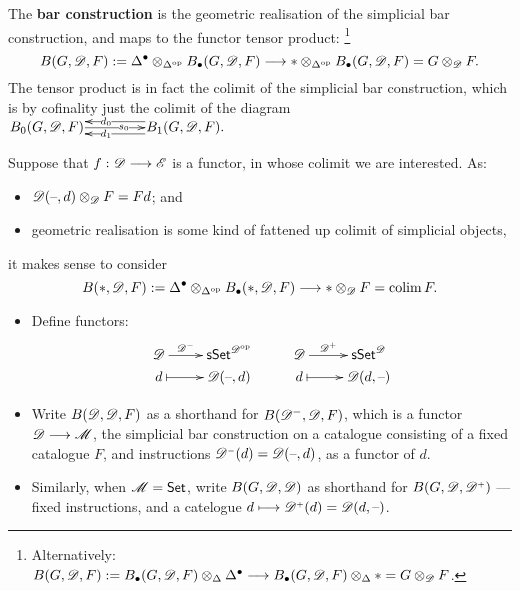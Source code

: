 \documentclass[11pt]{article}
\newcommand{\Dminus}{\scrD^\textup{\tiny$-$}}
\newcommand{\Dplus}{\scrD^\textup{\tiny$+$}}
\begin{document}
\begin{5. The unreasonably effective (co)bar construction}
\begin{itemise}
\item The \textbf{bar construction} is the geometric realisation of the simplicial bar construction, and maps to the functor tensor product:%
\footnote{Alternatively: $B(G,\mathscr{D},F):=B_\bullet (G,\mathscr{D},F)\otimes _{\Delta}\Delta^\bullet\longrightarrow B_\bullet (G,\mathscr{D},F)\otimes _{\Delta}*=G\otimes _{\mathscr{D}} F$.}
\[B(G,\mathscr{D},F):=\Delta^\bullet\otimes _{\Delta^{\textup{op}}}B_\bullet (G,\mathscr{D},F)\longrightarrow *\otimes _{\Delta^{\textup{op}}}B_\bullet (G,\mathscr{D},F)=G\otimes _{\mathscr{D}} F.\]
The tensor product is in fact the colimit of the simplicial bar construction, which is by cofinality just the colimit of the diagram
$\vcenter{
\def\labelstyle{\scriptstyle}
\xymatrix@C=1.5cm@1{
B_0(G,\scrD,F)
\ar[r]|-(.65){s_0}
&
B_1(G,\scrD,F).
\ar@<-1ex>[l]|-(.65){d_0}
\ar@<+1ex>[l]|-(.65){d_1}
}}$
\item Suppose that $f:\mathscr{D}\longrightarrow\mathscr{E}$ is a functor, in whose colimit we are interested. As:
\begin{itemize}\squishlist
\setlength{\parindent}{.25in}
\item $\mathscr{D}(\textup{--} ,d)\otimes_{\mathscr{D}} F=Fd$; and
\item geometric realisation is some kind of fattened up colimit of simplicial objects,
\end{itemize}
it makes sense to consider
\[B(*,\mathscr{D},F):=\Delta^\bullet \otimes _{\Delta^{\textup{op}}}B_\bullet (*,\mathscr{D},F)\longrightarrow *\otimes _{\mathscr{D}} F=\operatorname*{colim} F.\]

\item 
\begin{itemize}\squishlist
\setlength{\parindent}{.25in}
\item Define functors:
\[\xymatrix@R=0mm{
\ar[r]^-{\Dminus}%
\scrD&%
\sSet^{\scrD^{\op}}&
\ar[r]^-{\Dplus}%
\scrD&%
\sSet^{\scrD}\\%
d%
\ar@{|->}[r]&
\scrD(\DASH ,d)&d%
\ar@{|->}[r]&
\scrD(d,\DASH )
}\]
\item Write $B(\mathscr{D},\mathscr{D},F)$ as a shorthand for $B(\mathscr{D}^-,\mathscr{D},F)$, which is a functor $\mathscr{D}\longrightarrow\mathscr{M}$, the simplicial bar construction on a catalogue consisting of a fixed catalogue $F$, and instructions $\Dminus(d)=\scrD(\DASH ,d)$, as a functor of $d$.
\item Similarly, when $\mathscr{M}=\operatorname{{\mathsf{Set}}}$, write $B(G,\mathscr{D},\mathscr{D})$ as shorthand for $B(G,\scrd,\Dplus)$ --- fixed instructions, and a catelogue $d\mapsto\Dplus(d)=\scrd(d,\DASH )$.
\end{itemize}
\end{itemise}
\begin{shaded}


\end{shaded}
\end{5. The unreasonably effective (co)bar construction}
\end{document}
